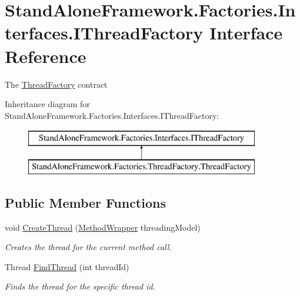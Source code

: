 \hypertarget{interface_stand_alone_framework_1_1_factories_1_1_interfaces_1_1_i_thread_factory}{\section{Stand\+Alone\+Framework.\+Factories.\+Interfaces.\+I\+Thread\+Factory Interface Reference}
\label{interface_stand_alone_framework_1_1_factories_1_1_interfaces_1_1_i_thread_factory}
}


The \hyperlink{namespace_stand_alone_framework_1_1_factories_1_1_thread_factory}{Thread\+Factory} contract  


Inheritance diagram for Stand\+Alone\+Framework.\+Factories.\+Interfaces.\+I\+Thread\+Factory\+:\begin{figure}[H]
\begin{center}
\leavevmode
\includegraphics[height=2.000000cm]{interface_stand_alone_framework_1_1_factories_1_1_interfaces_1_1_i_thread_factory}
\end{center}
\end{figure}
\subsection*{Public Member Functions}
\begin{DoxyCompactItemize}
\item 
void \hyperlink{interface_stand_alone_framework_1_1_factories_1_1_interfaces_1_1_i_thread_factory_aa57ffdc6e7234b5377bfc4bdc319f985}{Create\+Thread} (\hyperlink{class_stand_alone_framework_1_1_factories_1_1_method_factory_1_1_method_wrapper}{Method\+Wrapper} threading\+Model)
\begin{DoxyCompactList}\small\item\em Creates the thread for the current method call. \end{DoxyCompactList}\item 
Thread \hyperlink{interface_stand_alone_framework_1_1_factories_1_1_interfaces_1_1_i_thread_factory_a6a9c8007ba1e6738f7013089f1f9117c}{Find\+Thread} (int thread\+Id)
\begin{DoxyCompactList}\small\item\em Finds the thread for the specific thread id. \end{DoxyCompactList}\end{DoxyCompactItemize}
